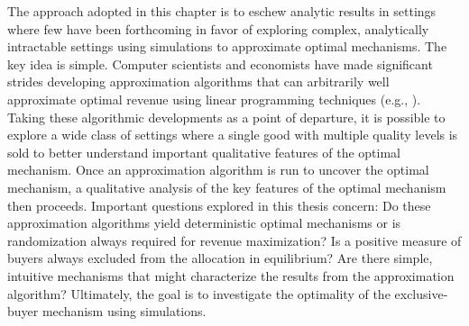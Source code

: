 
The approach adopted in this chapter is to eschew analytic results in settings where few have been forthcoming in favor of exploring complex, analytically intractable settings using simulations to approximate optimal mechanisms. The key idea is simple. Computer scientists and economists have made significant strides developing approximation algorithms that can arbitrarily well approximate optimal revenue using linear programming techniques (e.g., \cite{cai2012,belloni2010multidimensional}). Taking these algorithmic developments as a point of departure, it is possible to explore a wide class of settings where a single good with multiple quality levels is sold to better understand important qualitative features of the optimal mechanism. Once an approximation algorithm is run to uncover the optimal mechanism, a qualitative analysis of the key features of the optimal mechanism then proceeds. Important questions explored in this thesis concern: Do these approximation algorithms yield deterministic optimal mechanisms or is randomization always required for revenue maximization? Is a positive measure of buyers always excluded from the allocation in equilibrium? Are there simple, intuitive mechanisms that might characterize the results from the approximation algorithm? Ultimately, the goal is to investigate the optimality of the exclusive-buyer mechanism using simulations.


